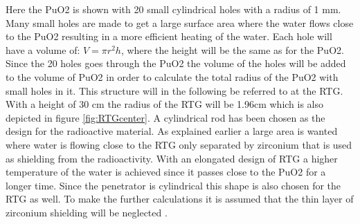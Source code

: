 Here the PuO2 is shown with 20 small cylindrical holes with a radius of 1 mm. Many small holes are made to get a large surface area where the water flows close to the PuO2 resulting in a more efficient heating of the water. Each hole will have a volume of: $V = \pi r^2 h$, where the height will be the same as for the PuO2. Since the 20 holes goes through the PuO2 the volume of the holes will be added to the volume of PuO2 in order to calculate the total radius of the PuO2 with small holes in it. This structure will in the following be referred to at the RTG. With a height of 30 cm the radius of the RTG will be 1.96cm which is also depicted in figure \ref{fig:RTGcenter}. A cylindrical rod has been chosen as the design for the radioactive material. As explained earlier a large area is wanted where water is flowing close to the RTG only separated by zirconium that is used as shielding from the radioactivity. With an elongated design of RTG a higher temperature of the water is achieved since it passes close to the PuO2 for a longer time. Since the penetrator is cylindrical this shape is also chosen for the RTG as well. To make the further calculations it is assumed that the thin layer of zirconium shielding will be neglected . 

